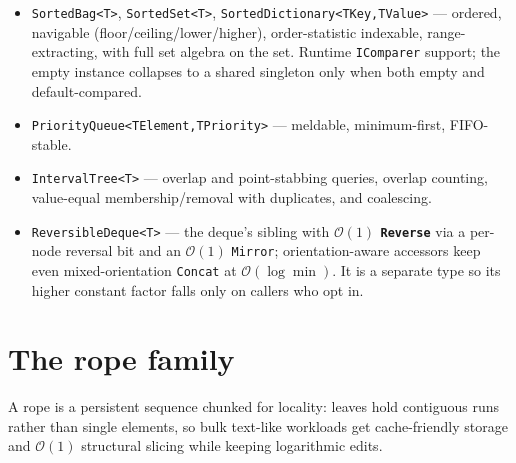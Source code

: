 \documentclass[11pt]{article}
\newcommand{\cs}[1]{\lstinline|#1|}
\newcommand{\bigO}{\ensuremath{\mathcal{O}}}
\begin{document}
\begin{itemize}[leftmargin=1.4em, itemsep=1pt]
  \item \cs{SortedBag<T>}, \cs{SortedSet<T>}, \cs{SortedDictionary<TKey,TValue>} --- ordered, navigable
    (floor/ceiling/lower/higher), order-statistic indexable, range-extracting, with full set algebra on
    the set. Runtime \cs{IComparer} support; the empty instance collapses to a shared singleton only
    when both empty and default-compared.
  \item \cs{PriorityQueue<TElement,TPriority>} --- meldable, minimum-first, FIFO-stable.
  \item \cs{IntervalTree<T>} --- overlap and point-stabbing queries, overlap counting, value-equal
    membership/removal with duplicates, and coalescing.
  \item \cs{ReversibleDeque<T>} --- the deque's sibling with \textbf{$\bigO(1)$ \cs{Reverse}} via a
    per-node reversal bit and an $\bigO(1)$ \cs{Mirror}; orientation-aware accessors keep even
    mixed-orientation \cs{Concat} at $\bigO(\log\min)$. It is a separate type so its higher constant
    factor falls only on callers who opt in.
\end{itemize}

\section{The rope family}
\label{sec:ropes}

A rope is a persistent sequence chunked for locality: leaves hold contiguous runs rather than single
elements, so bulk text-like workloads get cache-friendly storage and $\bigO(1)$ structural slicing while
keeping logarithmic edits.
\end{document}
